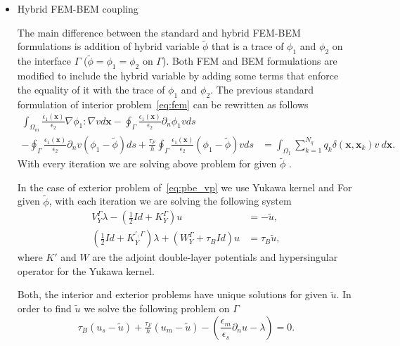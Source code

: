 \begin{itemize}
    \item Hybrid FEM-BEM coupling
    
    The main difference between the standard and hybrid FEM-BEM formulations is addition of hybrid variable $\widetilde{\phi}$ that is a trace of $\phi_1$ and $\phi_2$ on the interface $\Gamma$ ($\widetilde{\phi} = \phi_1 = \phi_2$ on  $\Gamma$). Both FEM and BEM formulations are modified to include the hybrid variable by adding some terms that enforce the equality of it with the trace of $\phi_1$ and $\phi_2$.
    The previous standard formulation of interior problem~\eqref{eq:fem} can be rewritten as follows
\begin{align*}
 \int_{\Omega_m} \frac{\epsilon_1(\mathbf{x})}{\epsilon_2} \nabla \phi_1 : \nabla v d\mathbf{x} -  \oint_\Gamma \frac{\epsilon_1(\mathbf{x})}{\epsilon_2}  \partial_n \phi_1 v ds
  & \\
 -  \oint_\Gamma \frac{\epsilon_1(\mathbf{x})}{\epsilon_2} \partial_n v (\phi_1 - \widetilde{\phi}) ds
  + \tfrac{\tau_F}{h} \oint_\Gamma \frac{\epsilon_1(\mathbf{x})}{\epsilon_2} (\phi_1 - \widetilde{\phi}) v ds & = \int_{\Omega_1}  \sum_{k=1}^{N_q} q_k\delta(\mathbf{x},\mathbf{x}_k)   v ~d\mathbf{x}.
\end{align*}
With every iteration we are solving above problem for given $\widetilde{\phi}$ .

In the case of exterior problem of~\eqref{eq:pbe_vp} we use Yukawa kernel and 
For given $\widetilde{\phi}$, with each iteration we are solving the following system
\begin{align*}
V_{Y}^{\Gamma} \lambda  - \left( \tfrac{1}{2}Id + K_{Y}^{\Gamma}  \right) u &= - \widetilde{u},  \\
 \left( \tfrac{1}{2} Id +  K_{Y}^{',\Gamma}\right)  \lambda + \left(W_{Y}^{\Gamma} + \tau_B Id\right)  u  &= \tau_B  \widetilde{u},
\end{align*}
where $K'$ and $W$ are the adjoint double-layer potentials and hypersingular operator for the Yukawa kernel.

Both, the interior and exterior problems have unique solutions for given $\widetilde{u}$. In order to find $\widetilde{u}$ we solve the following problem on $\Gamma$
$$
\tau_B \left( u_s - \widetilde{u}\right) + \tfrac{\tau_F}{h} \left( u_m - \widetilde{u}\right) - \left(\frac{\epsilon_m}{\epsilon_s} \partial_n u -\lambda\right)  = 0.
$$
\end{itemize}
